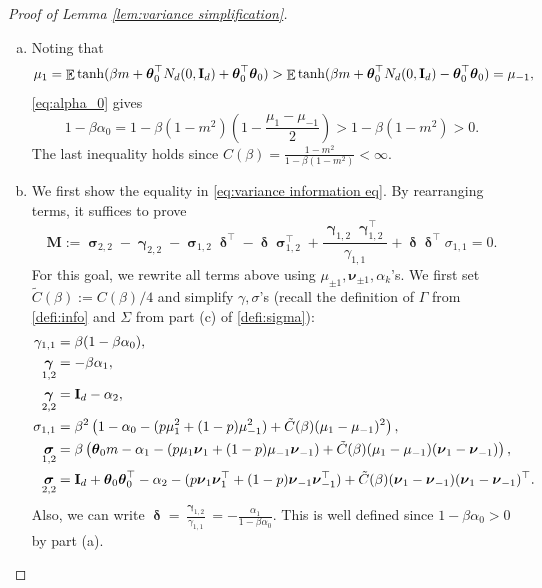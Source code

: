 \documentclass[preprint,reqno]{imsart}
\newcommand{\ttheta}{\boldsymbol{\theta}}
\newcommand{\I}{\mathbf{I}_{\mathnormal{d}}}
\DeclareMathOperator{\ggamma}{\boldsymbol{\gamma}}
\DeclareMathOperator{\ssigma}{\boldsymbol{\sigma}}
\DeclareMathOperator{\ddelta}{\boldsymbol{\delta}}
\DeclareMathOperator{\EE}{\mathbb{E}}
\begin{document}
\begin{appendix}
\begin{proof}[Proof of Lemma \ref{lem:variance simplification}]
\begin{enumerate}[(a)]
\item Noting that $$\mu_1 = \EE \tanh(\beta m + \ttheta_0^{\top} N_d (0,\I) + \ttheta_0^\top \ttheta_0) > \EE \tanh(\beta m + \ttheta_0^{\top} N_d (0,\I)  - \ttheta_0^\top \ttheta_0) =  \mu_{-1},$$  
\eqref{eq:alpha_0} gives $$1 - \beta \alpha_0 = 1- \beta(1-m^2) \left(1 - \frac{\mu_1 - \mu_{-1}}{2} \right) > 1 - \beta(1-m^2) > 0.$$
The last inequality holds since $C(\beta) = \frac{1 - m^2}{1 - \beta (1-m^2)} < \infty$.

\vspace{5mm}
\item We first show the equality in \eqref{eq:variance information eq}. By rearranging terms, it suffices to prove
$$\mathbf{M}:= \ssigma_{2,2}-\ggamma_{2,2} - \ssigma_{1,2} \ddelta^{\top} - \ddelta \ssigma_{1,2}^{\top} + \frac{\ggamma_{1,2} \ggamma_{1,2}^{\top}}{\gamma_{1,1}} + \ddelta \ddelta^{\top} \sigma_{1,1}  = 0.$$
For this goal, we rewrite all terms above using $\mu_{\pm 1}, \boldsymbol{\nu}_{\pm 1}, \alpha_k$'s. We first set $\tilde{C}(\beta) := C(\beta)/4$ and simplify $\gamma, \sigma$'s (recall the definition of $\Gamma$ from \cref{defi:info} and $\Sigma$ from part (c) of \cref{defi:sigma}):
\begin{align*}
    \gamma_{1,1} &= \beta (1 - \beta \alpha_0), \\
    \ggamma_{1,2} &= - \beta \alpha_1, \\
    \ggamma_{2,2} &= \I - \alpha_2, \\
    \sigma_{1,1} &= \beta^2 \left(1 - \alpha_0 - (p \mu_1^2 + (1-p) \mu_{-1}^2) + \tilde{C}(\beta) (\mu_1 - \mu_{-1})^2 \right), \\
    \ssigma_{1,2} &= \beta \left(\ttheta_0 m - \alpha_1 - (p \mu_1 \boldsymbol{\nu}_1 + (1-p) \mu_{-1} \boldsymbol{\nu}_{-1}) + \tilde{C}(\beta) (\mu_1 - \mu_{-1})(\boldsymbol{\nu}_1 - \boldsymbol{\nu}_{-1}) \right), \\
    \ssigma_{2,2} &= \I + \ttheta_0 \ttheta_0^{\top} - \alpha_2 -  (p \boldsymbol{\nu}_1 \boldsymbol{\nu}_1^\top + (1-p) \boldsymbol{\nu}_{-1} \boldsymbol{\nu}_{-1} ^\top) + \tilde{C}(\beta) (\boldsymbol{\nu}_1 - \boldsymbol{\nu}_{-1})(\boldsymbol{\nu}_1 - \boldsymbol{\nu}_{-1})^\top.
\end{align*}
Also, we can write $\ddelta = \frac{ \ggamma_{1,2}}{\gamma_{1,1}} = - \frac{\alpha_1}{1-\beta \alpha_0}.$ This is well defined since $1 - \beta \alpha_0 > 0$ by part (a).


\end{enumerate}
\end{proof}
\end{appendix}
\end{document}
